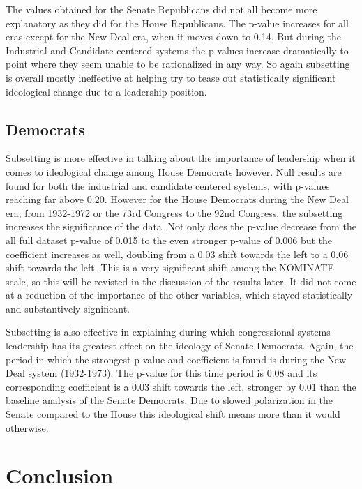 \documentclass[12pt,twoside]{reedthesis}
\begin{document}
  The values obtained for the Senate Republicans did not all become more
  explanatory as they did for the House Republicans. The p-value increases
  for all eras except for the New Deal era, when it moves down to 0.14.
  But during the Industrial and Candidate-centered systems the p-values
  increase dramatically to point where they seem unable to be rationalized
  in any way. So again subsetting is overall mostly ineffective at helping
  try to tease out statistically significant ideological change due to a
  leadership position.
  
  \subsection{Democrats}\label{democrats-1}
  
  Subsetting is more effective in talking about the importance of
  leadership when it comes to ideological change among House Democrats
  however. Null results are found for both the industrial and candidate
  centered systems, with p-values reaching far above 0.20. However for the
  House Democrats during the New Deal era, from 1932-1972 or the 73rd
  Congress to the 92nd Congress, the subsetting increases the significance
  of the data. Not only does the p-value decrease from the all full
  dataset p-value of 0.015 to the even stronger p-value of 0.006 but the
  coefficient increases as well, doubling from a 0.03 shift towards the
  left to a 0.06 shift towards the left. This is a very significant shift
  among the NOMINATE scale, so this will be revisted in the discussion of
  the results later. It did not come at a reduction of the importance of
  the other variables, which stayed statistically and substantively
  significant.
  
  Subsetting is also effective in explaining during which congressional
  systems leadership has its greatest effect on the ideology of Senate
  Democrats. Again, the period in which the strongest p-value and
  coefficient is found is during the New Deal system (1932-1973). The
  p-value for this time period is 0.08 and its corresponding coefficient
  is a 0.03 shift towards the left, stronger by 0.01 than the baseline
  analysis of the Senate Democrats. Due to slowed polarization in the
  Senate compared to the House this ideological shift means more than it
  would otherwise.
  
  \section{Conclusion}\label{conclusion}
  
\end{document}
